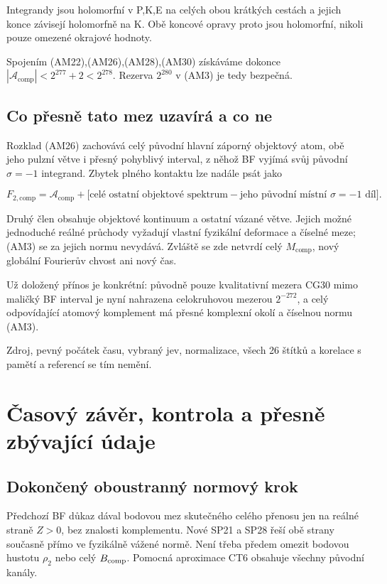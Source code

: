\documentclass[11pt,a4paper]{article}
\theoremstyle{remark}\newtheorem{remark}[theorem]{Poznámka}
\numberwithin{equation}{section}
\begin{document}
Integrandy jsou holomorfní v P,K,E na celých obou krátkých cestách a
jejich konce závisejí holomorfně na K. Obě koncové opravy proto jsou
holomorfní, nikoli pouze omezené okrajové hodnoty.

Spojením (AM22),(AM26),(AM28),(AM30) získáváme dokonce
\(|\mathcal A_{\mathrm{comp}}|<2^{277}+2<2^{278}\). Rezerva \(2^{280}\)
v (AM3) je tedy bezpečná.

\hypertarget{co-pux159esnux11b-tato-mez-uzavuxedruxe1-a-co-ne}{%
\subsection{Co přesně tato mez uzavírá a co
ne}\label{co-pux159esnux11b-tato-mez-uzavuxedruxe1-a-co-ne}}

Rozklad (AM26) zachovává celý původní hlavní záporný objektový atom, obě
jeho pulzní větve i přesný pohyblivý interval, z něhož BF vyjímá svůj
původní \(\sigma=-1\) integrand. Zbytek plného kontaktu lze nadále psát
jako

\[
F_{2,\mathrm{comp}}
=\mathcal A_{\mathrm{comp}}
 +\bigl[\text{celé ostatní objektové spektrum}
       -\text{jeho původní místní }\sigma=-1\text{ díl}\bigr].
\tag{AM31}
\]

Druhý člen obsahuje objektové kontinuum a ostatní vázané větve. Jejich
možné jednoduché reálné průchody vyžadují vlastní fyzikální deformace a
číselné meze; (AM3) se za jejich normu nevydává. Zvláště se zde netvrdí
celý \(M_{\mathrm{comp}}\), nový globální Fourierův chvost ani nový čas.

Už doložený přínos je konkrétní: původně pouze kvalitativní mezera CG30
mimo maličký BF interval je nyní nahrazena celokruhovou mezerou
\(2^{-272}\), a celý odpovídající atomový komplement má přesné komplexní
okolí a číselnou normu (AM3).

Zdroj, pevný počátek času, vybraný jev, normalizace, všech 26 štítků a
korelace s pamětí a referencí se tím nemění.

\clearpage
\section{Časový závěr, kontrola a přesně zbývající údaje}

\subsection{Dokončený oboustranný normový krok}

Předchozí BF důkaz dával bodovou mez skutečného celého přenosu
jen na reálné straně \(Z>0\), bez znalosti komplementu.
Nové SP21 a SP28 řeší obě strany současně přímo ve fyzikálně
vážené normě. Není třeba předem omezit bodovou hustotu
\(\rho_2\) nebo celý \(B_{\rm comp}\).
Pomocná aproximace CT6 obsahuje všechny původní kanály.
\end{document}
